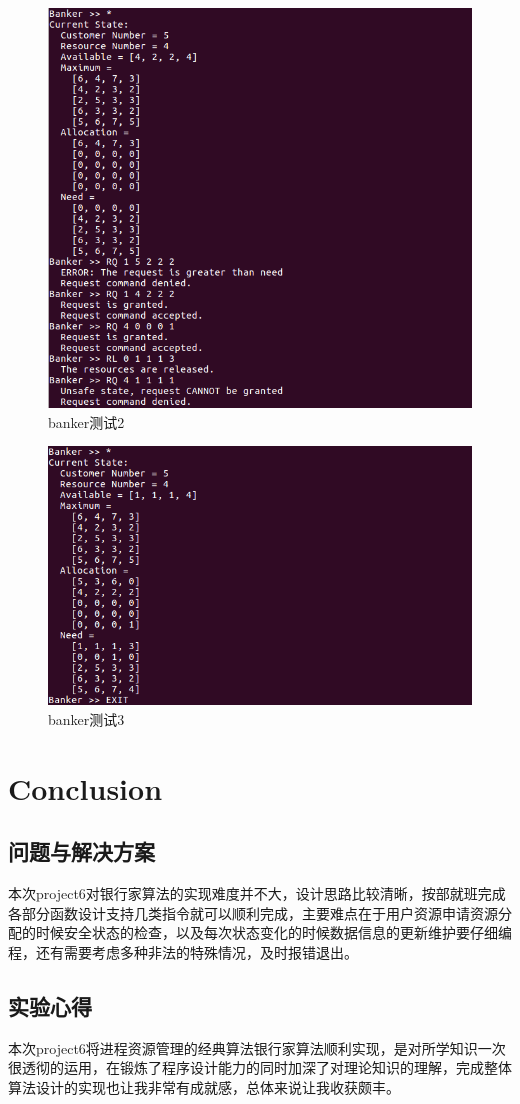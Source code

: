 \documentclass{article}
\begin{document}
\begin{figure}[htbp]
		\centering
		\includegraphics{b2}
		\caption{banker测试2} \label{banker测试2}
\end{figure}
\begin{figure}[htbp]
		\centering
		\includegraphics{b3}
		\caption{banker测试3} \label{banker测试3}
\end{figure}
\section{Conclusion}

\subsection{问题与解决方案}
本次project6对银行家算法的实现难度并不大，设计思路比较清晰，按部就班完成各部分函数设计支持几类指令就可以顺利完成，主要难点在于用户资源申请资源分配的时候安全状态的检查，以及每次状态变化的时候数据信息的更新维护要仔细编程，还有需要考虑多种非法的特殊情况，及时报错退出。

\subsection{实验心得}
本次project6将进程资源管理的经典算法银行家算法顺利实现，是对所学知识一次很透彻的运用，在锻炼了程序设计能力的同时加深了对理论知识的理解，完成整体算法设计的实现也让我非常有成就感，总体来说让我收获颇丰。

\end{document}
